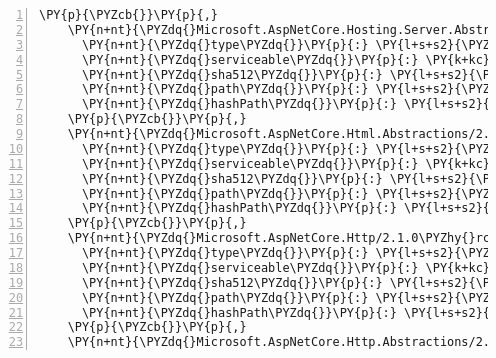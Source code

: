 \begin{Verbatim}[commandchars=\\\{\},numbers=left,firstnumber=1,stepnumber=1,numberblanklines=0]
    \PY{p}{\PYZcb{}}\PY{p}{,}
    \PY{n+nt}{\PYZdq{}Microsoft.AspNetCore.Hosting.Server.Abstractions/2.1.0\PYZhy{}rc1\PYZhy{}final\PYZdq{}}\PY{p}{:} \PY{p}{\PYZob{}}
      \PY{n+nt}{\PYZdq{}type\PYZdq{}}\PY{p}{:} \PY{l+s+s2}{\PYZdq{}package\PYZdq{}}\PY{p}{,}
      \PY{n+nt}{\PYZdq{}serviceable\PYZdq{}}\PY{p}{:} \PY{k+kc}{true}\PY{p}{,}
      \PY{n+nt}{\PYZdq{}sha512\PYZdq{}}\PY{p}{:} \PY{l+s+s2}{\PYZdq{}sha512\PYZhy{}sFXhvrer59qWlxQG5PguKKZ2OCvpwpI9uSdRfTE7sRC8k4ibO5eYtSZKZAnA7NET8NnDxaXqz66qj51x72X5ew==\PYZdq{}}\PY{p}{,}
      \PY{n+nt}{\PYZdq{}path\PYZdq{}}\PY{p}{:} \PY{l+s+s2}{\PYZdq{}microsoft.aspnetcore.hosting.server.abstractions/2.1.0\PYZhy{}rc1\PYZhy{}final\PYZdq{}}\PY{p}{,}
      \PY{n+nt}{\PYZdq{}hashPath\PYZdq{}}\PY{p}{:} \PY{l+s+s2}{\PYZdq{}microsoft.aspnetcore.hosting.server.abstractions.2.1.0\PYZhy{}rc1\PYZhy{}final.nupkg.sha512\PYZdq{}}
    \PY{p}{\PYZcb{}}\PY{p}{,}
    \PY{n+nt}{\PYZdq{}Microsoft.AspNetCore.Html.Abstractions/2.1.0\PYZhy{}rc1\PYZhy{}final\PYZdq{}}\PY{p}{:} \PY{p}{\PYZob{}}
      \PY{n+nt}{\PYZdq{}type\PYZdq{}}\PY{p}{:} \PY{l+s+s2}{\PYZdq{}package\PYZdq{}}\PY{p}{,}
      \PY{n+nt}{\PYZdq{}serviceable\PYZdq{}}\PY{p}{:} \PY{k+kc}{true}\PY{p}{,}
      \PY{n+nt}{\PYZdq{}sha512\PYZdq{}}\PY{p}{:} \PY{l+s+s2}{\PYZdq{}sha512\PYZhy{}Zn0uJgzvNq0bXZVI0bSzLZqrGE2E3Zug8bofmYPRpbsH5Cn0NX/lFr81l9KfffsD8HQOFPQdNsKjHAXjfm8BUA==\PYZdq{}}\PY{p}{,}
      \PY{n+nt}{\PYZdq{}path\PYZdq{}}\PY{p}{:} \PY{l+s+s2}{\PYZdq{}microsoft.aspnetcore.html.abstractions/2.1.0\PYZhy{}rc1\PYZhy{}final\PYZdq{}}\PY{p}{,}
      \PY{n+nt}{\PYZdq{}hashPath\PYZdq{}}\PY{p}{:} \PY{l+s+s2}{\PYZdq{}microsoft.aspnetcore.html.abstractions.2.1.0\PYZhy{}rc1\PYZhy{}final.nupkg.sha512\PYZdq{}}
    \PY{p}{\PYZcb{}}\PY{p}{,}
    \PY{n+nt}{\PYZdq{}Microsoft.AspNetCore.Http/2.1.0\PYZhy{}rc1\PYZhy{}final\PYZdq{}}\PY{p}{:} \PY{p}{\PYZob{}}
      \PY{n+nt}{\PYZdq{}type\PYZdq{}}\PY{p}{:} \PY{l+s+s2}{\PYZdq{}package\PYZdq{}}\PY{p}{,}
      \PY{n+nt}{\PYZdq{}serviceable\PYZdq{}}\PY{p}{:} \PY{k+kc}{true}\PY{p}{,}
      \PY{n+nt}{\PYZdq{}sha512\PYZdq{}}\PY{p}{:} \PY{l+s+s2}{\PYZdq{}sha512\PYZhy{}850AkQ+st5obXoYkg4OqeAgyUhKww3DRuhuVMGiWHRDbzyxxtkRVuv9hnzWAj6MIyF4ULZGTZkkUc7aiAYE/YQ==\PYZdq{}}\PY{p}{,}
      \PY{n+nt}{\PYZdq{}path\PYZdq{}}\PY{p}{:} \PY{l+s+s2}{\PYZdq{}microsoft.aspnetcore.http/2.1.0\PYZhy{}rc1\PYZhy{}final\PYZdq{}}\PY{p}{,}
      \PY{n+nt}{\PYZdq{}hashPath\PYZdq{}}\PY{p}{:} \PY{l+s+s2}{\PYZdq{}microsoft.aspnetcore.http.2.1.0\PYZhy{}rc1\PYZhy{}final.nupkg.sha512\PYZdq{}}
    \PY{p}{\PYZcb{}}\PY{p}{,}
    \PY{n+nt}{\PYZdq{}Microsoft.AspNetCore.Http.Abstractions/2.1.0\PYZhy{}rc1\PYZhy{}final\PYZdq{}}\PY{p}{:} \PY{p}{\PYZob{}}

\end{Verbatim}
